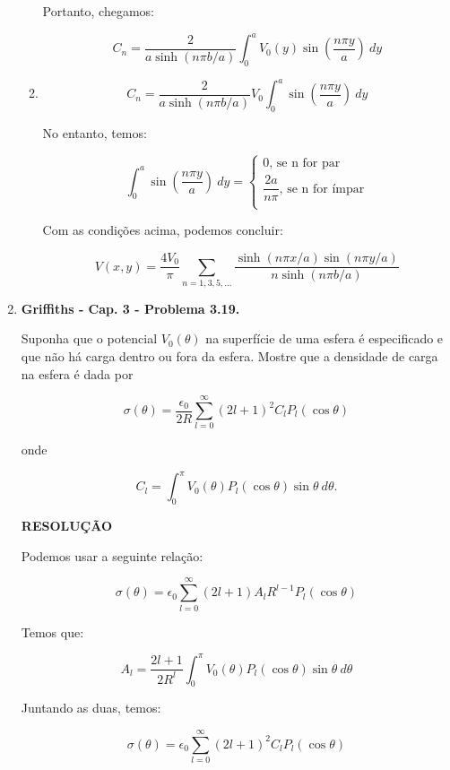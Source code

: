 \documentclass[11pt,a4paper]{article}
\begin{document}
\begin{enumerate}
\begin{enumerate}
Portanto, chegamos:

$$C_n = \displaystyle\dfrac{2}{a\sinh(n\pi b/a)}\displaystyle\int_0^{a} V_0(y) \sin\left(\displaystyle\dfrac{n\pi y}{a}\right) \ dy$$

\item

$$C_n = \displaystyle\dfrac{2}{a\sinh(n\pi b/a)}V_0\displaystyle\int_0^{a} \sin\left(\displaystyle\dfrac{n\pi y}{a}\right) \ dy$$

No entanto, temos:

$$\int_0^{a} \sin\left(\displaystyle\dfrac{n\pi y}{a}\right) \ dy = 
		\begin{cases}
			0,\, \textrm{se n for par} \\
			\displaystyle\dfrac{2a}{n\pi},\, \textrm{se n for ímpar} \\
		\end{cases}
	$$
	
Com as condições acima, podemos concluir:

$$V(x,y) = \displaystyle\dfrac{4V_0}{\pi}\displaystyle\sum_{n=1,3,5,...}\displaystyle\dfrac{\sinh(n\pi x/a) \sin(n\pi y/a)}{n \sinh(n\pi b/a)}$$

\end{enumerate}


\item \textbf{Griffiths - Cap. 3 - Problema 3.19.}

Suponha que o potencial $V_0(\theta)$ na superfície de uma esfera é especificado e que não há carga dentro ou fora da esfera. Mostre que a densidade de carga na esfera é dada por

$$\sigma (\theta) = \displaystyle\dfrac{\epsilon_0}{2R} \displaystyle\sum_{l=0}^\infty (2l + 1)^2 C_l P_l (\cos \theta)$$

onde 

$$C_l = \displaystyle\int_0^\pi V_0(\theta) P_l (\cos \theta) \sin \theta \ d\theta.$$

\textbf{RESOLUÇÃO}

Podemos usar a seguinte relação:

$$\sigma (\theta) = \epsilon_0 \displaystyle\sum_{l=0}^\infty (2l + 1) A_l R^{l-1} P_l (\cos \theta)$$

Temos que:

$$A_l = \displaystyle\dfrac{2l + 1}{2R^l} \displaystyle\int_0^\pi V_0(\theta) P_l (\cos \theta) \sin \theta \ d\theta$$

Juntando as duas, temos:

$$\sigma (\theta) = \epsilon_0 \displaystyle\sum_{l=0}^\infty (2l + 1)^2 C_l P_l (\cos \theta)$$


\end{enumerate}
\end{document}
